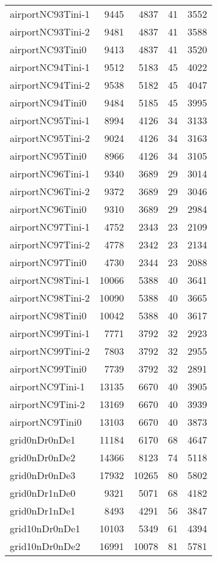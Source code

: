 \begin{longtable}{lrrrr}
airportNC93Tini-1 & 9445 & 4837 & 41 & 3552 \\
airportNC93Tini-2 & 9481 & 4837 & 41 & 3588 \\
airportNC93Tini0 & 9413 & 4837 & 41 & 3520 \\
airportNC94Tini-1 & 9512 & 5183 & 45 & 4022 \\
airportNC94Tini-2 & 9538 & 5182 & 45 & 4047 \\
airportNC94Tini0 & 9484 & 5185 & 45 & 3995 \\
airportNC95Tini-1 & 8994 & 4126 & 34 & 3133 \\
airportNC95Tini-2 & 9024 & 4126 & 34 & 3163 \\
airportNC95Tini0 & 8966 & 4126 & 34 & 3105 \\
airportNC96Tini-1 & 9340 & 3689 & 29 & 3014 \\
airportNC96Tini-2 & 9372 & 3689 & 29 & 3046 \\
airportNC96Tini0 & 9310 & 3689 & 29 & 2984 \\
airportNC97Tini-1 & 4752 & 2343 & 23 & 2109 \\
airportNC97Tini-2 & 4778 & 2342 & 23 & 2134 \\
airportNC97Tini0 & 4730 & 2344 & 23 & 2088 \\
airportNC98Tini-1 & 10066 & 5388 & 40 & 3641 \\
airportNC98Tini-2 & 10090 & 5388 & 40 & 3665 \\
airportNC98Tini0 & 10042 & 5388 & 40 & 3617 \\
airportNC99Tini-1 & 7771 & 3792 & 32 & 2923 \\
airportNC99Tini-2 & 7803 & 3792 & 32 & 2955 \\
airportNC99Tini0 & 7739 & 3792 & 32 & 2891 \\
airportNC9Tini-1 & 13135 & 6670 & 40 & 3905 \\
airportNC9Tini-2 & 13169 & 6670 & 40 & 3939 \\
airportNC9Tini0 & 13103 & 6670 & 40 & 3873 \\
grid0nDr0nDe1 & 11184 & 6170 & 68 & 4647 \\
grid0nDr0nDe2 & 14366 & 8123 & 74 & 5118 \\
grid0nDr0nDe3 & 17932 & 10265 & 80 & 5802 \\
grid0nDr1nDe0 & 9321 & 5071 & 68 & 4182 \\
grid0nDr1nDe1 & 8493 & 4291 & 56 & 3847 \\
grid10nDr0nDe1 & 10103 & 5349 & 61 & 4394 \\
grid10nDr0nDe2 & 16991 & 10078 & 81 & 5781 \\

\end{longtable}
